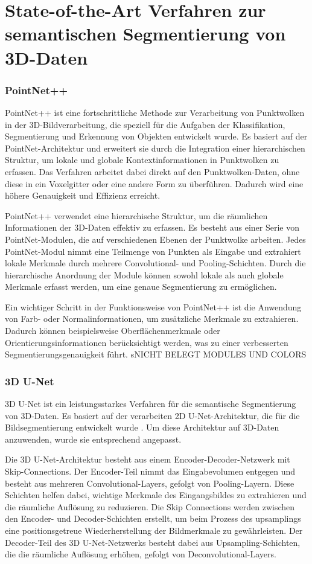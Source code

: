 \chapter{State-of-the-Art Verfahren zur semantischen Segmentierung von 3D-Daten}
\subsection{PointNet++}
PointNet++ ist eine fortschrittliche Methode zur Verarbeitung von Punktwolken
in der 3D-Bildverarbeitung, die speziell für die Aufgaben der Klassifikation,
Segmentierung und Erkennung von Objekten entwickelt wurde. Es basiert auf der
PointNet-Architektur und erweitert sie durch die Integration einer
hierarchischen Struktur, um lokale und globale Kontextinformationen in
Punktwolken zu erfassen. Das Verfahren arbeitet dabei direkt auf den
Punktwolken-Daten, ohne diese in ein Voxelgitter oder eine andere Form zu
überführen. Dadurch wird eine höhere Genauigkeit und Effizienz erreicht.

PointNet++ verwendet eine hierarchische Struktur, um die räumlichen
Informationen der 3D-Daten effektiv zu erfassen. Es besteht aus einer Serie von
PointNet-Modulen, die auf verschiedenen Ebenen der Punktwolke arbeiten. Jedes
PointNet-Modul nimmt eine Teilmenge von Punkten als Eingabe und extrahiert
lokale Merkmale durch mehrere Convolutional- und Pooling-Schichten. Durch die
hierarchische Anordnung der Module können sowohl lokale als auch globale
Merkmale erfasst werden, um eine genaue Segmentierung zu ermöglichen.

Ein wichtiger Schritt in der Funktionsweise von PointNet++ ist die Anwendung
von Farb- oder Normalinformationen, um zusätzliche Merkmale zu extrahieren.
Dadurch können beispielsweise Oberflächenmerkmale oder
Orientierungsinformationen berücksichtigt werden, was zu einer verbesserten
Segmentierungsgenauigkeit führt. \cite{NIPS2017_d8bf84be} sNICHT BELEGT MODULES
UND COLORS

\subsection{3D U-Net}

3D U-Net ist ein leistungsstarkes Verfahren für die semantische Segmentierung von 3D-Daten.
Es basiert auf der verarbeiten 2D U-Net-Architektur, die für die Bildsegmentierung entwickelt wurde \cite{ronneberger2015unet}.
Um diese Architektur auf 3D-Daten anzuwenden, wurde sie entsprechend angepasst.

Die 3D U-Net-Architektur besteht aus einem Encoder-Decoder-Netzwerk mit
Skip-Connections. Der Encoder-Teil nimmt das Eingabevolumen entgegen und
besteht aus mehreren Convolutional-Layers, gefolgt von Pooling-Layern. Diese
Schichten helfen dabei, wichtige Merkmale des Eingangsbildes zu extrahieren und
die räumliche Auflösung zu reduzieren. Die Skip Connections werden zwischen den
Encoder- und Decoder-Schichten erstellt, um beim Prozess des upsamplings eine
positionsgetreue Wiederherstellung der Bildmerkmale zu gewährleisten. Der
Decoder-Teil des 3D U-Net-Netzwerks besteht dabei aus Upsampling-Schichten, die
die räumliche Auflösung erhöhen, gefolgt von Deconvolutional-Layers.

